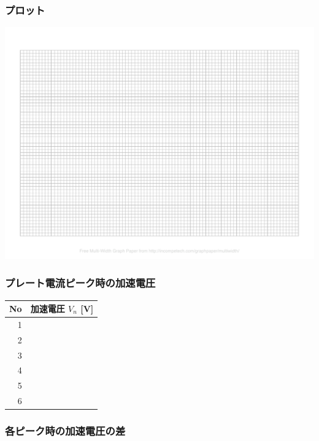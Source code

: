 \subsubsection*{プロット}
\bigskip\bigskip
\hspace*{-\parindent}
\includegraphics[scale=0.93, bb=33 32 365 362]{13_FranckHertz/graph.pdf}

\vspace*{2cm}


\subsubsection*{プレート電流ピーク時の加速電圧}

\hspace*{-\parindent}
\begin{tabular}{|r|c|}
\hline
No & 加速電圧 $V_n$ [V]\\
\hline\hline
1 & \\\hline
2 & \\\hline
3 & \\\hline
4 & \\\hline
5 & \\\hline
6 & \\\hline
\end{tabular}

\subsubsection*{各ピーク時の加速電圧の差}

